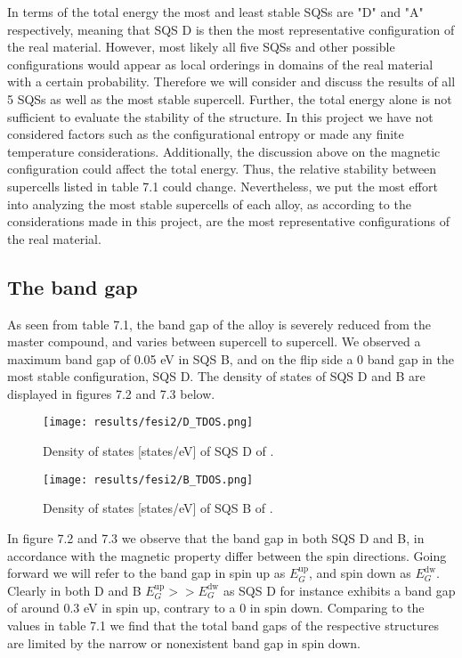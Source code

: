 In terms of the total energy the most and least stable SQSs are "D" and "A" respectively, meaning that SQS D is then the most representative configuration of the real material. However, most likely all five SQSs and other possible configurations would appear as local orderings in domains of the real material with a certain probability. Therefore we will consider and discuss the results of all 5 SQSs as well as the most stable supercell. Further, the total energy alone is not sufficient to evaluate the stability of the structure. In this project we have not considered factors such as the configurational entropy or made any finite temperature considerations. Additionally, the discussion above on the magnetic configuration could affect the total energy. Thus, the relative stability between supercells listed in table 7.1 could change. Nevertheless, we put the most effort into analyzing the most stable supercells of each alloy, as according to the considerations made in this project, are the most representative configurations of the real material.
\newpage
\subsection{The band gap}
As seen from table 7.1, the band gap of the alloy is severely reduced from the master compound, and varies between supercell to supercell. We observed a maximum band gap of 0.05 eV in SQS B, and on the flip side a 0 band gap in the most stable configuration, SQS D. The density of states of SQS D and B are displayed in figures 7.2 and 7.3 below. 

\begin{figure}[H]
	\centering
	\texttt{[image: results/fesi2/D\_TDOS.png]}
	\caption{Density of states [states/eV] of SQS D of .}
\end{figure}

\begin{figure}[H]
\centering
	\texttt{[image: results/fesi2/B\_TDOS.png]}
	\caption{Density of states [states/eV] of SQS B of .}
\end{figure}  

In figure 7.2  and 7.3 we observe that the band gap in both SQS D and B, in accordance with the magnetic property differ between the spin directions. Going forward we will refer to the band gap in spin up as $E_G ^\text{up}$, and spin down as $E_G ^\text{dw}$. Clearly in both D and B $E_G ^\text{up} >> E_G ^\text{dw}$ as SQS D for instance exhibits a band gap of around 0.3 eV in spin up, contrary to a 0 in spin down. Comparing to the values in table 7.1 we find that the total band gaps of the respective structures are limited by the narrow or nonexistent band gap in spin down. 

